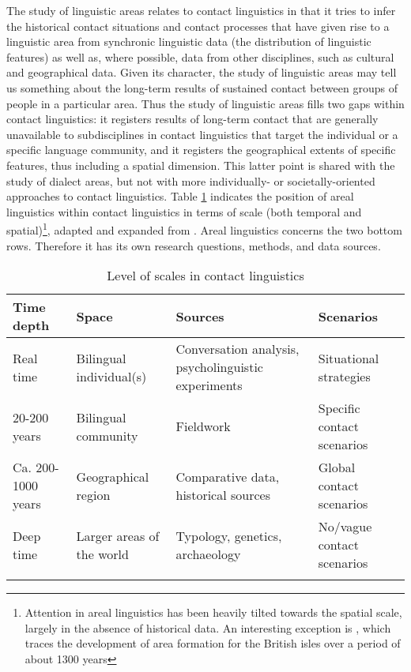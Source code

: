 \documentclass[output=paper,
modfonts
]{langscibook}
\begin{document}
The study of linguistic areas relates to contact linguistics in that it tries to infer the historical contact situations and contact processes that have given rise to a linguistic area from synchronic linguistic data (the distribution of linguistic features) as well as, where possible, data from other disciplines, such as cultural and geographical data. Given its character, the study of linguistic areas may tell us something about the long-term results of sustained contact between groups of people in a particular area. Thus the study of linguistic areas fills two gaps within contact linguistics: it registers results of long-term contact that are generally unavailable to subdisciplines in contact linguistics that target the individual or a specific language community, and it registers the geographical extents of specific features, thus including a spatial dimension. This latter point is shared with the study of dialect areas,
but not with more individually- or societally-oriented approaches to contact linguistics. Table \ref{tab-scales} indicates the position of areal linguistics within contact linguistics in terms of scale (both temporal and spatial)\footnote{Attention in areal linguistics has been heavily tilted towards the spatial scale, largely in the absence of historical data. An interesting exception is \textcite{dedioetalforthcevidence}, which traces the development of area formation for the British isles over a period of about 1300 years}, adapted and expanded  from \cite{muysken2008conceptual}. Areal linguistics concerns the two bottom rows. Therefore it has its own research questions, methods, and data sources.

\begin{table}
\caption{Level of scales in contact linguistics  \parencite[adapted from][]{muysken2008conceptual}}
\label{tab-scales}
 \begin{tabular}{p{2cm} p{2cm} p{4.5cm} p{2.5cm}} 
  \lsptoprule
         Time depth & Space & Sources & Scenarios\\ 
  \midrule
  Real time  &   Bilingual individual(s) &    Conversation analysis, psycholinguistic experiments  & Situational strategies\\
  20-200 years  &  Bilingual community &   Fieldwork &    Specific contact scenarios\\
  Ca. 200-1000 years  &   Geographical region &   Comparative data, historical sources & Global contact scenarios \\
  Deep time  &   Larger areas of the world &  Typology, genetics, archaeology   &  No/vague contact scenarios \\
  \lspbottomrule
 \end{tabular}
\end{table}
\end{document}
